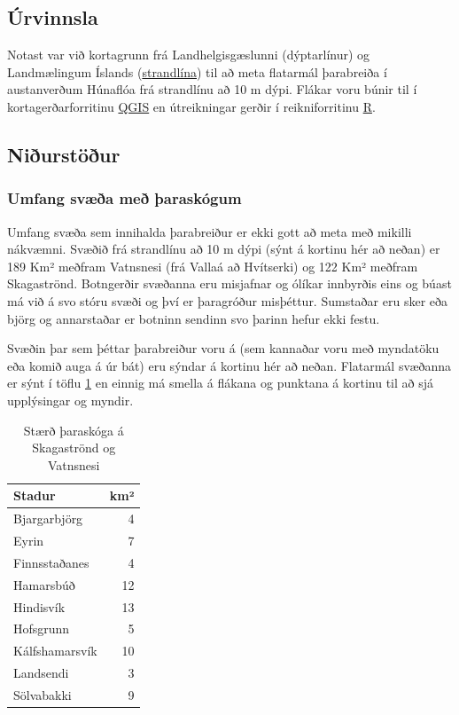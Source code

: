 \documentclass[icelandic,]{book}
\begin{document}
\hypertarget{urvinnsla}{%
\subsection{Úrvinnsla}\label{urvinnsla}}

Notast var við kortagrunn frá Landhelgisgæslunni (dýptarlínur) og Landmælingum Íslands (\href{https://atlas.lmi.is/LmiData/index.php?id=8613727663752}{strandlína}) til að meta flatarmál þarabreiða í austanverðum Húnaflóa frá strandlínu að 10 m dýpi. Flákar voru búnir til í kortagerðarforritinu \href{https://www.qgis.org/en/site/}{QGIS} en útreikningar gerðir í reikniforritinu \href{https://www.r-project.org/}{R}.

\hypertarget{niurstour}{%
\subsection{Niðurstöður}\label{niurstour}}

\hypertarget{umfang-sva-me-araskogum}{%
\subsubsection{Umfang svæða með þaraskógum}\label{umfang-sva-me-araskogum}}

Umfang svæða sem innihalda þarabreiður er ekki gott að meta með mikilli nákvæmni. Svæðið frá strandlínu að 10 m dýpi (sýnt á kortinu hér að neðan) er 189 Km² meðfram Vatnsnesi (frá Vallaá að Hvítserki) og 122 Km² meðfram Skagaströnd. Botngerðir svæðanna eru misjafnar og ólíkar innbyrðis eins og búast má við á svo stóru svæði og því er þaragróður misþéttur. Sumstaðar eru sker eða björg og annarstaðar er botninn sendinn svo þarinn hefur ekki festu.

Svæðin þar sem þéttar þarabreiður voru á (sem kannaðar voru með myndatöku eða komið auga á úr bát) eru sýndar á kortinu hér að neðan. Flatarmál svæðanna er sýnt í töflu \ref{tab:skogar} en einnig má smella á flákana og punktana á kortinu til að sjá upplýsingar og myndir.

\begin{table}[t]

\caption{\label{tab:skogar}Stærð þaraskóga á Skagaströnd og Vatnsnesi}
\centering
\begin{tabular}{lr}
\toprule
Stadur & km²\\
\midrule
Bjargarbjörg & 4\\
Eyrin & 7\\
Finnsstaðanes & 4\\
Hamarsbúð & 12\\
Hindisvík & 13\\
\addlinespace
Hofsgrunn & 5\\
Kálfshamarsvík & 10\\
Landsendi & 3\\
Sölvabakki & 9\\
\bottomrule
\end{tabular}
\end{table}
\end{document}
